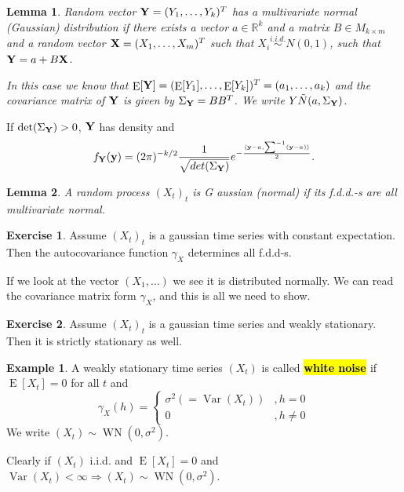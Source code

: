 \documentclass[12pt,a4paper, notitlepage]{book}
\newcommand{\hlc}[2][yellow]{ {\sethlcolor{#1} \hl{#2}} }
\newcommand{\hlcr}[1]{\hlc[lightred]{#1}}
\theoremstyle{definition} %
\newtheorem{example}{Example}[chapter]
\newtheorem{exercise}{Exercise}[chapter]
\theoremstyle{plain} %
\newtheorem{definition}{Lemma}[chapter]
\newcommand{\R}{\mathbb R}
\DeclareMathOperator{\Var}{Var}
\DeclareMathOperator{\E}{E}
\DeclareMathOperator{\Wn}{WN}
\newcommand{\New}[1]{ {\bf \hlcr{#1} } }
\begin{document}
\begin{definition}
Random vector ${\bf Y } = (Y_1, \dots, Y_k)^T$ has a multivariate normal (Gaussian) distribution if there exists a 
vector $a \in \R^k$ and a matrix $B \in M_{k\times m}$ and a random vector ${\bf X} = (X_1, \dots, X_m)^T$ such that $X_i 
\overset{i.i.d.}{\sim}  N(0,1)$, such that ${\bf Y} = a + B {\bf X}$.

In this case we know that $\E [ {\bf Y} ] = (\E [Y_1], \dots, \E [Y_k])^T = (a_1, \dots, a_k)$ and the covariance matrix of ${\bf Y}$ is given by $\Sigma_{\bf Y} = B B^T$.
We write $Y \tilde N(a, \Sigma_{\bf Y})$.

\end{definition}

If $ \det (\Sigma_{\bf Y}) > 0$, ${\bf Y}$ has density and 
\[ f_{\bf Y}({\bf y}) = (2 \pi)^{-k/2} \frac{1}{\sqrt{det(\Sigma_{\bf Y} ) } } e^{- \frac{ \langle{\bf y} - a, \sum^{-1}({\bf y} - a)\rangle}{2}}. \]

\begin{definition}
A random process $(X_t)_t$ is G aussian (normal) if its f.d.d.-s are all multivariate normal.
\end{definition} 


\begin{exercise}
Assume $(X_t)_t$ is a gaussian time series with constant expectation. Then the autocovariance function $\gamma_X$ determines all f.d.d-s.
\end{exercise}
\begin{hint}
If we look at the vector $(X_1, \dots)$ we see it is distributed normally. We can read the covariance matrix form $\gamma_X$, and this is all we need to show.
\end{hint}


\begin{exercise}
Assume $(X_t)_t$ is a gaussian time series and weakly stationary. Then it is strictly stationary as well. 
\end{exercise}


\begin{example}
A weakly stationary time series $(X_t)$ is called  \New{ white noise } if $\E [X_t] = 0$ for all $t$ and 
$$\gamma_X(h) =  \begin{cases} \sigma^2 ( = \Var(X_t)) & ,h = 0 \\
			0 & , h \neq 0 \end{cases}
$$
We write $(X_t) \sim \Wn(0, \sigma^2)$.

Clearly if $(X_t)$ i.i.d. and $ \E [X_t] = 0$ and $ \Var (X_t) < \infty \Rightarrow (X_t) \sim \Wn(0, \sigma^2)$.  
\end{example}
\end{document}
